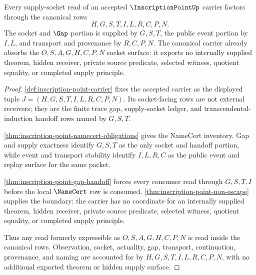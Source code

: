 \begin{theorem}
\label{thm:inscription-point-socket-surface-merged-into-canonical-carrier}
Every supply-socket read of an accepted $\InscriptionPointUp$ carrier factors through the canonical rows
$$
H,G,S,T,I,L,R,C,P,N.
$$
The socket and $\Gap$ portion is supplied by $G,S,T$, the public event portion by $I,L$, and transport and provenance by $R,C,P,N$. The canonical carrier already absorbs the $O,S,A,G,H,C,P,N$ socket surface: it exports no internally supplied theorem, hidden receiver, private source predicate, selected witness, quotient equality, or completed supply principle.
\end{theorem}
\begin{proof}
\autoref{def:inscription-point-carrier} fixes the accepted carrier as the displayed tuple $J=(H,G,S,T,I,L,R,C,P,N)$. Its socket-facing rows are not external receivers; they are the finite trace gap, supply-socket ledger, and transcendental-induction handoff rows named by $G,S,T$.

\autoref{thm:inscription-point-namecert-obligations} gives the NameCert inventory. Gap and supply exactness identify $G,S,T$ as the only socket and handoff portion, while event and transport stability identify $I,L,R,C$ as the public event and replay surface for the same packet.

\autoref{thm:inscription-point-gap-handoff} forces every consumer read through $G,S,T,I$ before the local $\NameCert$ row is consumed. \autoref{thm:inscription-point-non-escape} supplies the boundary: the carrier has no coordinate for an internally supplied theorem, hidden receiver, private source predicate, selected witness, quotient equality, or completed supply principle.

Thus any read formerly expressible as $O,S,A,G,H,C,P,N$ is read inside the canonical rows. Observation, socket, actuality, gap, transport, continuation, provenance, and naming are accounted for by $H,G,S,T,I,L,R,C,P,N$, with no additional exported theorem or hidden supply surface.
\end{proof}

